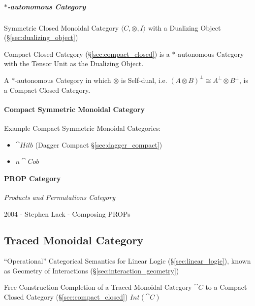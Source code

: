 \subparagraph{$*$-autonomous Category}\label{sec:star_autonomous}\hfill

Symmetric Closed Monoidal Category $\langle C, \otimes, I \rangle$
with a Dualizing Object (\S\ref{sec:dualizing_object})

Compact Closed Category (\S\ref{sec:compact_closed}) is a
$*$-autonomous Category with the Tensor Unit as the Dualizing Object.

A $*$-autonomous Category in which $\otimes$ is Self-dual, i.e. $(A
\otimes B)^\bot \cong A^\bot \otimes B^\bot$, is a Compact Closed
Category. \cite{abramsky-gay-nagarajan96}



\paragraph{Compact Symmetric Monoidal Category}
\label{sec:compact_symmetric_monoidal}\hfill

Example Compact Symmetric Monoidal Categories:

\begin{itemize}
\item $\cat{Hilb}$ (Dagger Compact \S\ref{sec:dagger_compact})
\item $n\cat{Cob}$
\end{itemize}



\paragraph{PROP Category}\label{sec:prop_category}\hfill

\emph{Products and Permutations Category}

2004 - Stephen Lack - Composing PROPs



\subsection{Traced Monoidal Category}\label{sec:traced_monoidal}

``Operational'' Categorical Semantics for Linear Logic
(\S\ref{sec:linear_logic}), known as Geometry of Interactions
(\S\ref{sec:interaction_geometry})

Free Construction Completion of a Traced Monoidal Category $\cat{C}$
to a Compact Closed Category (\S\ref{sec:compact_closed})
$Int(\cat{C})$

